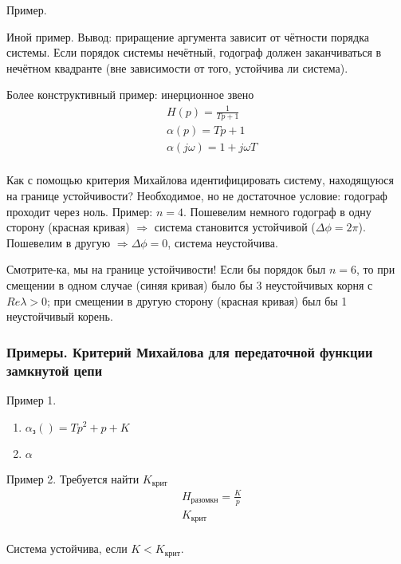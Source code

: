 \documentclass[main.tex]{subfiles}
\begin{document}
Пример.

Иной пример.
Вывод: приращение аргумента зависит от чётности порядка системы.
Если порядок системы нечётный, годограф должен заканчиваться в нечётном квадранте (вне зависимости от того, устойчива ли система).

Более конструктивный пример: инерционное звено
\begin{align*}
	&  H(p) = \frac{1}{Tp + 1} \\
	& \alpha(p) = Tp + 1 \\
	& \alpha(j \omega) = 1 + j \omega T \\
\end{align*}

Как с помощью критерия Михайлова идентифицировать систему, находящуюся на границе устойчивости?
Необходимое, но не достаточное условие: годограф проходит через ноль.
Пример: $ n=4 $.
Пошевелим немного годограф в одну сторону (красная кривая) $ \Rightarrow $ система становится устойчивой ($ \Delta \phi = 2 \pi $).
Пошевелим в другую $ \Rightarrow  \Delta \phi = 0$, система неустойчива.

Смотрите-ка, мы на границе устойчивости!
Если бы порядок был $ n = 6 $, то при смещении в одном случае (синяя кривая) было бы 3 неустойчивых корня с $Re \lambda > 0$; при смещении в другую сторону (красная кривая) был бы 1 неустойчивый корень.
\subsubsection{Примеры. Критерий Михайлова для передаточной функции замкнутой цепи}

Пример 1.
\begin{enumerate}[noitemsep]
    \item $ \alpha_{\text{з}}() = Tp^2 + p + K $
    \item $ \alpha_{} $ 
\end{enumerate}

Пример 2. Требуется найти $ K_{\text{крит}} $
\begin{align*}
	& H_{\text{разомкн}} = \frac{K}{p}\\ %
	& K_{\text{крит}} \\
\end{align*}

Система устойчива, если $ K < K_{\text{крит}} $.
\end{document}
